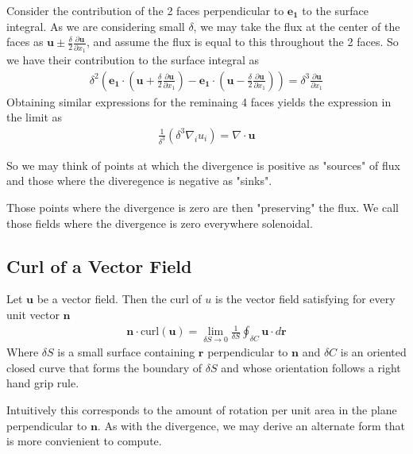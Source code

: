 \documentclass[]{article}
\begin{document}
Consider the contribution of the 2 faces perpendicular to $\mathbf{e_1}$ to the surface integral. As we are considering small $\delta$, we may take the flux at the center of the faces as $\mathbf{u} \pm \frac{\delta}{2} \frac{\partial \mathbf{u}}{\partial x_1}$, and assume the flux is equal to this throughout the 2 faces. So we have their contribution to the surface integral as 
\begin{align*}
		\delta^2 \left(\mathbf{e_1} \cdot \left(\mathbf{u} + \frac{\delta}{2} \frac{\partial \mathbf{u}}{\partial x_1}\right) - \mathbf{e_1} \cdot \left(\mathbf{u} - \frac{\delta}{2} \frac{\partial \mathbf{u}}{\partial x_1}\right)\right)
	= \delta^3 \frac{\partial \mathbf{u}}{\partial x_1}
\end{align*}
Obtaining similar expressions for the reminaing 4 faces yields the expression in the limit as 
\begin{align*}
		\frac{1}{\delta^3} (\delta^3 \nabla_i u_i) = \nabla \cdot \mathbf{u}
\end{align*}

So we may think of points at which the divergence is positive as "sources" of flux and those where the diveregence is negative as "sinks". 

Those points where the divergence is zero are then "preserving" the flux. We call those fields where the divergence is zero everywhere solenoidal.

\subsection{Curl of a Vector Field}

\begin{defi} [Curl]
		Let  $\mathbf{u}$ be a vector field. Then the curl of $u$ is the vector field satisfying for every unit vector $\mathbf{n}$
		\begin{align*}
				\mathbf{n} \cdot \text{curl}(\mathbf{u}) = \lim_{\delta S \to 0} \frac{1}{\delta S} \oint_{\delta C} \mathbf{u} \cdot d\mathbf{r}
		\end{align*}
		Where $\delta S$ is a small surface containing $\mathbf{r}$ perpendicular to $\mathbf{n}$ and $\delta C$ is an oriented closed curve that forms the boundary of $\delta S$ and whose orientation follows a right hand grip rule.
\end{defi}

Intuitively this corresponds to the amount of rotation per unit area in the plane perpendicular to $\mathbf{n}$. As with the divergence, we may derive an alternate form that is more convienient to compute.
\end{document}
